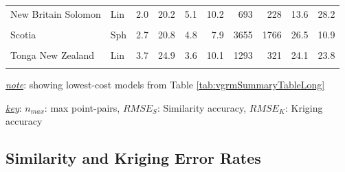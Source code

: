 \begin{table}
{\begin{threeparttable}
\begin{tabular}[t]{llrrrrrrrr}
New Britain Solomon & Lin & 2.0 & 20.2 & 5.1 & 10.2 & 693 & 228 & 13.6 & 28.2\\
\cellcolor{gray!6}{S Philippines} & \cellcolor{gray!6}{Lin} & \cellcolor{gray!6}{3.2} & \cellcolor{gray!6}{29.0} & \cellcolor{gray!6}{1.0} & \cellcolor{gray!6}{5.0} & \cellcolor{gray!6}{1014} & \cellcolor{gray!6}{40} & \cellcolor{gray!6}{25.6} & \cellcolor{gray!6}{22.9}\\
Scotia & Sph & 2.7 & 20.8 & 4.8 & 7.9 & 3655 & 1766 & 26.5 & 10.9\\
\cellcolor{gray!6}{Sumatra Banda Sea} & \cellcolor{gray!6}{Sph} & \cellcolor{gray!6}{6.6} & \cellcolor{gray!6}{21.0} & \cellcolor{gray!6}{5.1} & \cellcolor{gray!6}{12.8} & \cellcolor{gray!6}{10598} & \cellcolor{gray!6}{5850} & \cellcolor{gray!6}{18.0} & \cellcolor{gray!6}{20.4}\\
Tonga New Zealand & Lin & 3.7 & 24.9 & 3.6 & 10.1 & 1293 & 321 & 24.1 & 23.8\\
\cellcolor{gray!6}{Vanuatu} & \cellcolor{gray!6}{Lin} & \cellcolor{gray!6}{1.2} & \cellcolor{gray!6}{20.4} & \cellcolor{gray!6}{2.6} & \cellcolor{gray!6}{10.8} & \cellcolor{gray!6}{2918} & \cellcolor{gray!6}{286} & \cellcolor{gray!6}{37.1} & \cellcolor{gray!6}{54.6}\\
\bottomrule
\end{tabular}
\begin{tablenotes}
\item \uline{\textit{note}}: showing lowest-cost models from Table \ref{tab:vgrmSummaryTableLong}
\item \uline{\textit{key}}: $n_{max}$: max point-pairs, $RMSE_S$: Similarity accuracy, $RMSE_K$: Kriging accuracy
\end{tablenotes}
\end{threeparttable}}
\end{table}

\hypertarget{similarity-and-kriging-error-rates}{%
\subsection{Similarity and Kriging Error Rates}\label{similarity-and-kriging-error-rates}}

